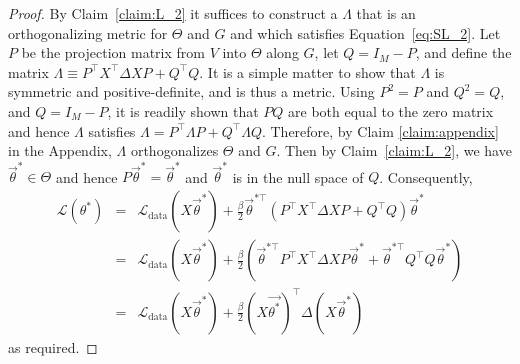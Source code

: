 \documentclass{article}
\numberwithin{myclaim}{section}
\begin{document}
\begin{proof}
By Claim~\ref{claim:L_2} it suffices to construct a $\Lambda$ that is an orthogonalizing metric for $\Theta$ and $G$ and which satisfies Equation~\ref{eq:SL_2}. Let $P$ be the projection matrix from $V$ into $\Theta$ along $G$, let $Q = I_M - P$, and define the matrix $\Lambda \equiv P^\top X^\top \Delta X P + Q^\top Q$. It is a simple matter to show that $\Lambda$ is symmetric and positive-definite, and is thus a metric. Using $P^2 = P$ and $Q^2 = Q$, and $Q = I_M - P$, it is readily shown that $PQ$ are both equal to the zero matrix and hence $\Lambda$ satisfies $\Lambda = P^\top \Lambda P + Q^\top \Lambda Q$. Therefore, by Claim \ref{claim:appendix} in the Appendix, $\Lambda$ orthogonalizes $\Theta$ and $G$. Then by Claim~\ref{claim:L_2}, we have $\vec{\theta}^*  \in \Theta$ and hence $P\vec{\theta}^*=\vec{\theta}^*$ and $\vec{\theta}^*$ is in the null space of $Q$. Consequently, 
\begin{eqnarray}
\mathcal{L}(\theta^*) &=& \mathcal{L}_\mathrm{data}(X\vec{\theta}^*)+\frac{\beta}{2} \vec{\theta}^{*\top }\left(P^\top X^\top \Delta X P + Q^\top Q \right) \vec{\theta}^* \\
 &=& \mathcal{L}_\mathrm{data}(X\vec{\theta}^*)+\frac{\beta}{2} \left(\vec{\theta}^{*\top }P^\top X^\top \Delta X P  \vec{\theta}^* + \vec{\theta}^{*\top }Q^\top Q  \vec{\theta}^* \right)\\
  &=& \mathcal{L}_\mathrm{data}(X\vec{\theta}^*) + \frac{\beta}{2} \left(X \vec{\theta^* }\right) ^\top \Delta \left(X \vec{\theta}^*\right)
\end{eqnarray}
as required.
\end{proof}
\end{document}
